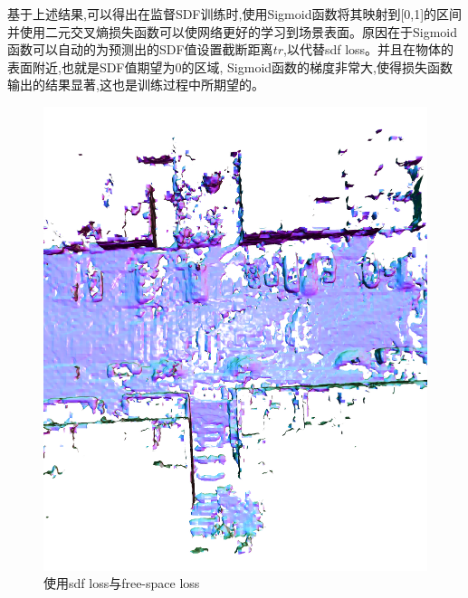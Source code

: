 基于上述结果,可以得出在监督SDF训练时,使用Sigmoid函数将其映射到[0,1]的区间并使用二元交叉熵损失函数可以使网络更好的学习到场景表面。原因在于Sigmoid函数可以自动的为预测出的SDF值设置截断距离$tr$,以代替sdf loss。并且在物体的表面附近,也就是SDF值期望为0的区域, Sigmoid函数的梯度非常大,使得损失函数输出的结果显著,这也是训练过程中所期望的。
\begin{figure}[htbp]
	\centering
	\begin{minipage}{0.45\linewidth}
		\centering
		\includegraphics[width=1\linewidth]{figures/kittiwbce.png}
        \caption*{使用sdf loss与free-space loss}
	\end{minipage}
	\begin{minipage}{0.45\linewidth}
		\centering

\end{minipage}
\end{figure}
